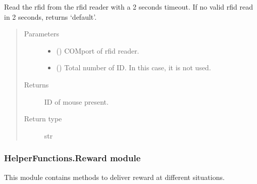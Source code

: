\documentclass[letterpaper,10pt,english]{sphinxmanual}
\begin{document}
\begin{fulllineitems}
\label{\detokenize{NoSeMazeControl/HelperFunctions:HelperFunctions.RFID.check_rfid}}
\pysigstartsignatures
{}
\pysigstopsignatures
\sphinxAtStartPar
Read the rfid from the rfid reader with a 2 seconds timeout.
If no valid rfid read in 2 seconds, returns ‘default’.
\begin{quote}\begin{description}
\item[{Parameters}] \leavevmode\begin{itemize}
\item {} 
\sphinxAtStartPar
{} () \textendash{} COM\sphinxhyphen{}port of rfid reader.

\item {} 
\sphinxAtStartPar
{} () \textendash{} Total number of ID. In this case, it is not used.

\end{itemize}

\item[{Returns}] \leavevmode
\sphinxAtStartPar
{} \textendash{} ID of mouse present.

\item[{Return type}] \leavevmode
\sphinxAtStartPar
str

\end{description}\end{quote}

\end{fulllineitems}


\begin{DUlineblock}{0em}
\item[] 
\end{DUlineblock}


\subsubsection{HelperFunctions.Reward module}
\label{\detokenize{NoSeMazeControl/HelperFunctions:module-HelperFunctions.Reward}}\label{\detokenize{NoSeMazeControl/HelperFunctions:helperfunctions-reward-module}}
\sphinxAtStartPar
This module contains methods to deliver reward at different situations.
\end{document}
